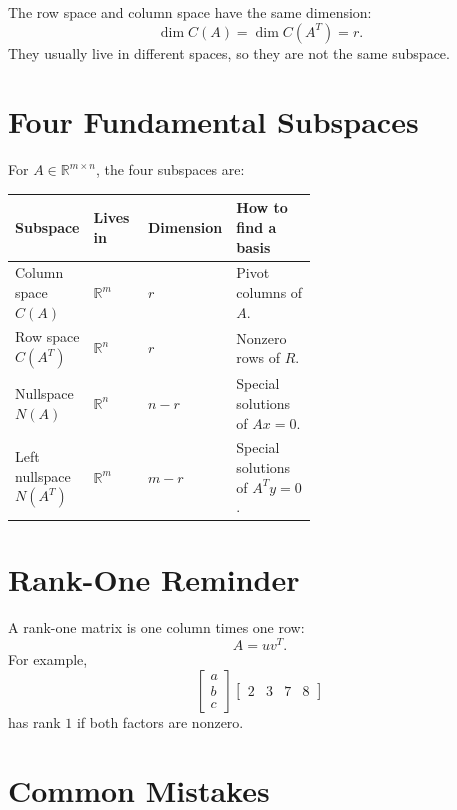 \documentclass[10pt]{article}
\begin{document}
The row space and column space have the same dimension:
\[
\dim C(A)=\dim C(A^{T})=r.
\]
They usually live in different spaces, so they are not the same subspace.

\section{Four Fundamental Subspaces}

For \(A\in\mathbb{R}^{m\times n}\), the four subspaces are:

\begin{center}
\small
\begin{tabularx}{\linewidth}{@{}L{0.24\linewidth}L{0.18\linewidth}L{0.18\linewidth}Y@{}}
\toprule
Subspace & Lives in & Dimension & How to find a basis \\
\midrule
Column space \(C(A)\) & \(\mathbb{R}^m\) & \(r\) & Pivot columns of \(A\). \\
Row space \(C(A^{T})\) & \(\mathbb{R}^n\) & \(r\) & Nonzero rows of \(R\). \\
Nullspace \(N(A)\) & \(\mathbb{R}^n\) & \(n-r\) & Special solutions of \(Ax=0\). \\
Left nullspace \(N(A^{T})\) & \(\mathbb{R}^m\) & \(m-r\) & Special solutions of \(A^{T}y=0\). \\
\bottomrule
\end{tabularx}
\end{center}


\section{Rank-One Reminder}

A rank-one matrix is one column times one row:
\[
A=uv^{T}.
\]
For example,
\[
\begin{bmatrix}
a\\b\\c
\end{bmatrix}
\begin{bmatrix}
2&3&7&8
\end{bmatrix}
\]
has rank \(1\) if both factors are nonzero.


\section{Common Mistakes}
\end{document}
